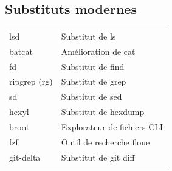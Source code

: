 \documentclass{article}
\begin{document}
\begin{multicols}{4}
    \section*{Substituts modernes}

    \begin{tabularx}{\columnwidth}{lX}
        lsd          & Substitut de ls             \\
        batcat       & Amélioration de cat         \\
        fd           & Substitut de find           \\
        ripgrep (rg) & Substitut de grep           \\
        sd           & Substitut de sed            \\
        hexyl        & Substitut de hexdump        \\
        broot        & Explorateur de fichiers CLI \\
        fzf          & Outil de recherche floue    \\
        git-delta    & Substitut de git diff       \\
    \end{tabularx}

\end{multicols}
\end{document}
